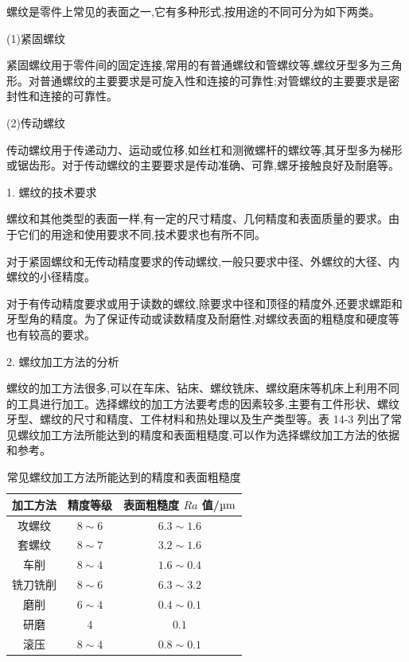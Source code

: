 \documentclass[UTF8]{ctexbook}
\newcommand{\◎}{\ensuremath{\bigcirc}}
\begin{document}
螺纹是零件上常见的表面之一,它有多种形式,按用途的不同可分为如下两类。

(1)紧固螺纹

紧固螺纹用于零件间的固定连接,常用的有普通螺纹和管螺纹等,螺纹牙型多为三角形。对普通螺纹的主要要求是可旋入性和连接的可靠性;对管螺纹的主要要求是密封性和连接的可靠性。

(2)传动螺纹

传动螺纹用于传递动力、运动或位移,如丝杠和测微螺杆的螺纹等,其牙型多为梯形或锯齿形。对于传动螺纹的主要要求是传动准确、可靠,螺牙接触良好及耐磨等。

1. 螺纹的技术要求

螺纹和其他类型的表面一样,有一定的尺寸精度、几何精度和表面质量的要求。由于它们的用途和使用要求不同,技术要求也有所不同。

对于紧固螺纹和无传动精度要求的传动螺纹,一般只要求中径、外螺纹的大径、内螺纹的小径精度。

对于有传动精度要求或用于读数的螺纹,除要求中径和顶径的精度外,还要求螺距和牙型角的精度。为了保证传动或读数精度及耐磨性,对螺纹表面的粗糙度和硬度等也有较高的要求。

2. 螺纹加工方法的分析

螺纹的加工方法很多,可以在车床、钻床、螺纹铣床、螺纹磨床等机床上利用不同的工具进行加工。选择螺纹的加工方法要考虑的因素较多,主要有工件形状、螺纹牙型、螺纹的尺寸和精度、工件材料和热处理以及生产类型等。表 14-3 列出了常见螺纹加工方法所能达到的精度和表面粗糙度,可以作为选择螺纹加工方法的依据和参考。

\begin{table}[H]
    \centering
    \caption{常见螺纹加工方法所能达到的精度和表面粗糙度}
    \begin{tabular}{|c|c|c|}
        \hline
        加工方法 & 精度等级 & 表面粗糙度 $Ra$ 值/$\text{\textmu m}$ \\
        \hline
        攻螺纹 & $8 \sim 6$ & $6.3 \sim 1.6$ \\
        套螺纹 & $8 \sim 7$ & $3.2 \sim 1.6$ \\
        车削 & $8 \sim 4$ & $1.6 \sim 0.4$ \\
        铣刀铣削 & $8 \sim 6$ & $6.3 \sim 3.2$ \\
        磨削 & $6 \sim 4$ & $0.4 \sim 0.1$ \\
        研磨 & $4$ & $0.1$ \\
        滚压 & $8 \sim 4$ & $0.8 \sim 0.1$ \\
        \hline
    \end{tabular}
\end{table}
\end{document}
